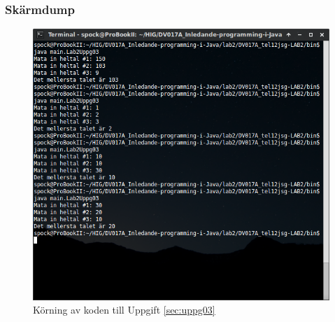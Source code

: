 \subsubsection{Skärmdump}
\begin{figure}[htbp]
    \centering
        \includegraphics[width=\linewidth]{img/03.png}
    \caption{Körning av koden till Uppgift \ref{sec:uppg03}}
    \label{fig:uppg03-screenshot}
\end{figure}

